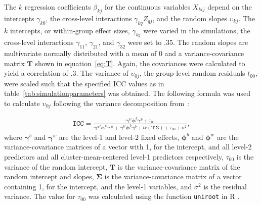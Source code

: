 \documentclass[10pt, a4paper, titlepage]{article}
\begin{document}
The $k$ regression coefficients $\beta_{kj}$ for the continuous variables $X_{kij}$ depend on the intercepts $\gamma_{k0}$, the cross-level interactions $\gamma_{kq}Z_{qj}$, and the random slopes $\upsilon_{kj}$. The $k$ intercepts, or within-group effect sizes, $\gamma_{kj}$ were varied in the simulations, the cross-level interactions $\gamma_{11}$, $\gamma_{21}$, and $\gamma_{32}$ were set to .35. The random slopes are multivariate normally distributed with a mean of 0 and a variance-covariance matrix $\mathbf{T}$ shown in equation~\ref{eq:T}. Again, the covariances were calculated to yield a correlation of .3. The variance of $\upsilon_{0j}$, the group-level random residuals $t_{00}$, were scaled such that the specified ICC values as in table~\ref{tab:simulationparameters} was obtained. The following formula was used to calculate $\upsilon_{0j}$ following the variance decomposition from~\cite{rights2019}:

\begin{align}
\label{eq:variancedecomposition}
\texttt{ICC} = \frac{\boldsymbol{\gamma}^{b'}\boldsymbol{\phi}^{b}\boldsymbol{\gamma}^{b} + \tau_{00}}{\boldsymbol{\gamma}^{w'}\boldsymbol{\phi}^{w}\boldsymbol{\gamma}^{w} + \boldsymbol{\gamma}^{b'}\boldsymbol{\phi}^{b}\boldsymbol{\gamma}^{b} + tr(\mathbf{T}\boldsymbol{\Sigma})+ \tau_{00} + \sigma^{2}},
\end{align} where $\boldsymbol{\gamma}^{b}$ and $\boldsymbol{\gamma}^{w}$ are the level-1 and level-2 fixed effects, $\boldsymbol{\phi}^{b}$ and $\boldsymbol{\phi}^{w}$ are the variance-covariance matrices of a vector with 1, for the intercept, and all level-2 predictors and all cluster-mean-centered level-1 predictors respectively, $\tau_{00}$ is the variance of the random intercept, $\mathbf{T}$ is the variance-covariance matrix of the random intercept and slopes, $\boldsymbol{\Sigma}$ is the variance-covariance matrix of a vector containing 1, for the intercept, and the level-1 variables, and $\sigma^{2}$ is the residual variance. The value for $\tau_{00}$ was calculated using the function \texttt{uniroot} in R \citep{rcoreteam2023}.
\end{document}
